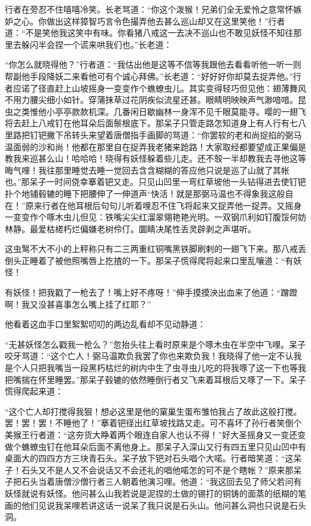 \documentclass[12pt,UTF8]{ctexbook}
\begin{document}
行者在旁忍不住嘻嘻冷笑。长老骂道：“你这个泼猴！兄弟们全无爱怜之意常怀嫉妒之心。你做出这样獐智巧言令色撮弄他去甚么巡山却又在这里笑他！”行者道：“不是笑他我这笑中有味。你看猪八戒这一去决不巡山也不敢见妖怪不知往那里去躲闪半会捏一个谎来哄我们也。”长老道：

“你怎么就晓得他？”行者道：“我估出他是这等不信等我跟他去看看听他一听一则帮副他手段降妖二来看他可有个诚心拜佛。”长老道：“好好好你却莫去捉弄他。”行者应诺了径直赶上山坡摇身一变变作个蟭蟟虫儿。其实变得轻巧但见他：翅薄舞风不用力腰尖细小如针。穿蒲抹草过花阴疾似流星还甚。眼睛明映映声气渺喑喑。昆虫之类惟他小亭亭款款机深。几番闲日歇幽林一身浑不见千眼莫能寻。嘤的一翅飞将去赶上八戒钉在他耳朵后面鬃根底下。那呆子只管走路怎知道身上有人行有七八里路把钉钯撇下吊转头来望着唐僧指手画脚的骂道：“你罢软的老和尚捉掐的弼马温面弱的沙和尚！他都在那里自在捉弄我老猪来跄路！大家取经都要望成正果偏是教我来巡甚么山！哈哈哈！晓得有妖怪躲着些儿走。还不彀一半却教我去寻他这等晦气哩！我往那里睡觉去睡一觉回去含含糊糊的答应他只说是巡了山就了其帐也。”那呆子一时间侥幸搴着钯又走。只见山凹里一弯红草坡他一头钻得进去使钉钯扑个地铺毂辘的睡下把腰伸了一伸道声“快活！就是那弼马温也不得象我这般自在！”原来行者在他耳根后句句儿听着哩忍不住飞将起来又捉弄他一捉弄。又摇身一变变作个啄木虫儿但见：铁嘴尖尖红溜翠翎艳艳光明。一双钢爪利如钉腹馁何妨林静。最爱枯槎朽烂偏嫌老树伶仃。圜睛决尾性丢灵辟剥之声堪听。

这虫鹥不大不小的上秤称只有二三两重红铜嘴黑铁脚刷剌的一翅飞下来。那八戒丢倒头正睡着了被他照嘴唇上扢揸的一下。那呆子慌得爬将起来口里乱嚷道：“有妖怪！

有妖怪！把我戳了一枪去了！嘴上好不疼呀！”伸手摸摸泱出血来了他道：“蹭蹬啊！我又没甚喜事怎么嘴上挂了红耶？”

他看着这血手口里絮絮叨叨的两边乱看却不见动静道：

“无甚妖怪怎么戳我一枪么？”忽抬头往上看时原来是个啄木虫在半空中飞哩。呆子咬牙骂道：“这个亡人！弼马温欺负我罢了你也来欺负我！我晓得了他一定不认我是个人只把我嘴当一段黑朽枯烂的树内中生了虫寻虫儿吃的将我啄了这一下也等我把嘴揣在怀里睡罢。”那呆子毂辘的依然睡倒行者又飞来着耳根后又啄了一下。呆子慌得爬起来道：

“这个亡人却打搅得我狠！想必这里是他的窠巢生蛋布雏怕我占了故此这般打搅。罢！罢！罢！不睡他了！”搴着钯径出红草坡找路又走。可不喜坏了孙行者笑倒个美猴王行者道：“这夯货大睁着两个眼连自家人也认不得！”好大圣摇身又一变还变做个蟭蟟虫钉在他耳朵后面不离他身上。那呆子入深山又行有四五里只见山凹中有桌面大的四四方方三块青石头。呆子放下钯对石头唱个大喏。行者暗笑道：“这呆子！石头又不是人又不会说话又不会还礼的唱他喏怎的可不是个瞎帐？”原来那呆子把石头当着唐僧沙僧行者三人朝着他演习哩。他道：“我这回去见了师父若问有妖怪就说有妖怪。他问甚么山我若说是泥捏的土做的锡打的铜铸的面蒸的纸糊的笔画的他们见说我呆哩若讲这话一说呆了我只说是石头山。他问甚么洞也只说是石头洞。
\end{document}
